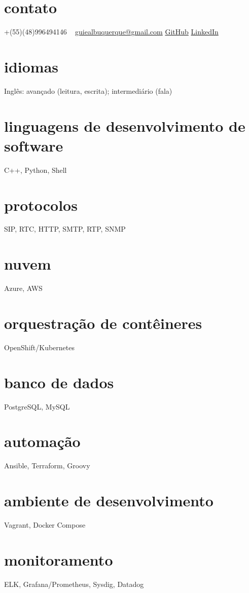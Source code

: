 \documentclass[]{friggeri-cv} %
\begin{document}



\begin{aside} %
\section{contato}
+(55)(48)996494146
~
\href{mailto:guiealbuquerque@gmail.com}{guiealbuquerque@gmail.com}
\href{https://github.com/heisendumb}{GitHub}
\href{https://www.linkedin.com/in/heisenbugger/}{LinkedIn}
\section{idiomas}
Inglês: avançado (leitura, escrita); intermediário (fala)
\section{linguagens de desenvolvimento de software}
C++, Python, Shell
\section{protocolos}
SIP, RTC, HTTP, SMTP, RTP, SNMP
\section{nuvem}
Azure, AWS
\section{orquestração de contêineres}
OpenShift/Kubernetes
\section{banco de dados}
PostgreSQL, MySQL
\section{automação}
Ansible, Terraform, Groovy
\section{ambiente de desenvolvimento}
Vagrant, Docker Compose
\section{monitoramento}
ELK, Grafana/Prometheus, Sysdig, Datadog
\end{aside}
\end{document}
